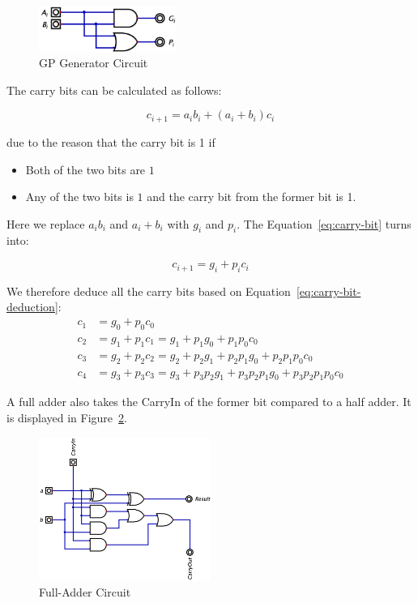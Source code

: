 \documentclass[conference]{IEEEtran}
\begin{document}
\begin{figure}[h!]
\centering
\includegraphics[width=0.4\textwidth]{assets/generate_gp.png}
\caption{GP Generator Circuit}
\label{fig:gp_generator}
\end{figure}

The carry bits can be calculated as follows:

\begin{equation}\label{eq:carry-bit}
    c_{i+1} = a_i b_i + (a_i + b_i) c_i
\end{equation}

due to the reason that the carry bit is 1 if

\begin{itemize}
    \item Both of the two bits are $1$
    \item Any of the two bits is $1$ and the carry bit from the former bit is 1.
\end{itemize}

Here we replace $a_ib_i$ and $a_i + b_i$ with $g_i$ and $p_i$. The Equation~\ref{eq:carry-bit} turns into:

\begin{equation}\label{eq:carry-bit-deduction}
    c_{i+1} = g_i + p_i c_i
\end{equation}

We therefore deduce all the carry bits based on Equation~\ref{eq:carry-bit-deduction}:
\begin{align}
    c_1 &= g_0 + p_0 c_0 \label{eq:temp1}\\
    c_2 &= g_1 + p_1 c_1 = g_1 + p_1 g_0 + p_1 p_0 c_0 \\
    c_3 &= g_2 + p_2 c_2 = g_2 + p_2 g_1 + p_2 p_1 g_0 + p_2 p_1 p_0 c_0 \\
    c_4 &= g_3 + p_3 c_3 = g_3 + p_3 p_2 g_1 + p_3 p_2 p_1 g_0 + p_3 p_2 p_1 p_0 c_0 \label{eq:temp2}
\end{align}




A full adder also takes the CarryIn of the former bit compared to a half adder. It is displayed in Figure~\ref{fig:full_adder}. 


\begin{figure}[h!]
    \centering
    \includegraphics[width=0.5\textwidth]{assets/full_adder.png}
    \caption{Full-Adder Circuit}
    \label{fig:full_adder}
\end{figure}
\end{document}
